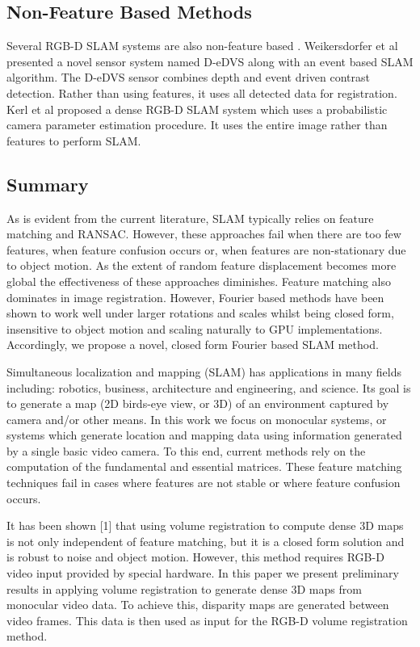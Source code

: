 \subsection{Non-Feature Based Methods}
Several RGB-D SLAM systems are also non-feature based \cite{Weikersdorfer14Event,Izadi11Kinectfusion,Kerl13Dense}. Weikersdorfer et al \cite{Weikersdorfer14Event} presented a novel sensor system named D-eDVS along with an event based SLAM algorithm. The D-eDVS sensor combines depth and event driven contrast detection. Rather than using features, it uses all detected data for registration. Kerl et al \cite{Kerl13Dense} proposed a dense RGB-D SLAM system which uses a probabilistic camera parameter estimation procedure. It uses the entire image rather than features to perform SLAM.
\subsection{Summary}
As is evident from the current literature, SLAM typically relies on feature matching and RANSAC. However, these approaches fail when there are too few features, when feature confusion occurs or, when features are non-stationary due to object motion. As the extent of random feature displacement becomes more global the effectiveness of these approaches diminishes. Feature matching also dominates in image registration. However, Fourier based methods have been shown to work well under larger rotations and scales \cite{Gonzalez11Improving} whilst being closed form, insensitive to object motion and scaling naturally to GPU implementations. Accordingly, we propose a novel, closed form Fourier based SLAM method.

Simultaneous localization and mapping (SLAM) has applications in many fields including: robotics, business, architecture and engineering, and science. Its goal is to generate a map (2D birds-eye view, or 3D) of an environment captured by camera and/or other means. In this work we focus on monocular systems, or systems which generate location and mapping data using information generated by a single basic video camera. To this end, current methods rely on the computation of the fundamental and essential matrices. These feature matching techniques fail in cases where features are not stable or where feature confusion occurs. 

It has been shown [1] that using volume registration to compute dense 3D maps is not only independent of feature matching, but it is a closed form solution and is robust to noise and object motion. However, this method requires RGB-D video input provided by special hardware. In this paper we present preliminary results in applying volume registration to generate dense 3D maps from monocular video data. To achieve this, disparity maps are generated between video frames. This data is then used as input for the RGB-D volume registration method.
